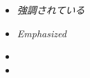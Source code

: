 \documentclass[]{jlreq} \usepackage{mystyle}
\title{}
\author{江口聡}
\begin{document}
\maketitle
\begin{itemize}
\item \emph{強調されている}


\item \emph{Emphasized}


\item {}


\item {}

\end{itemize}



% 
% 
\end{document}
